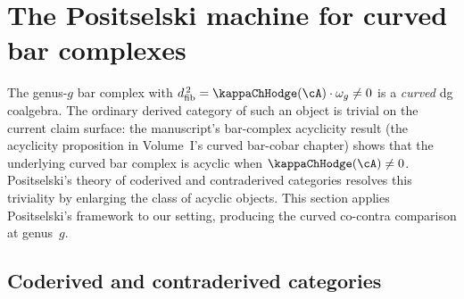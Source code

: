 \section{The Positselski machine for curved bar complexes}
\label{sec:positselski-machine}

\providecommand{\Dco}{\mathsf{D}^{\mathrm{co}}}
\providecommand{\Dctr}{\mathsf{D}^{\mathrm{ctr}}}
\providecommand{\Hot}{\mathsf{Hot}}
\providecommand{\Acyclco}{\mathsf{Acycl}^{\mathrm{co}}}

The genus-$g$ bar complex with $\dfib^{\,2} = \kappaChHodge(\cA) \cdot \omega_g
\neq 0$ is a \emph{curved} dg coalgebra. The ordinary derived
category of such an object is trivial on the current claim surface:
the manuscript's bar-complex acyclicity result
\textup{(}the acyclicity proposition in Volume~I's curved bar-cobar
chapter\textup{)}
shows that the underlying curved bar complex is acyclic when
$\kappaChHodge(\cA) \neq 0$.
Positselski's theory of coderived and contraderived categories
\cite{Pos11} resolves this triviality by enlarging the class of
acyclic objects. This section applies Positselski's framework to
our setting, producing the curved co-contra comparison at genus~$g$.

\subsection{Coderived and contraderived categories}
\label{subsec:coderived-contraderived}

